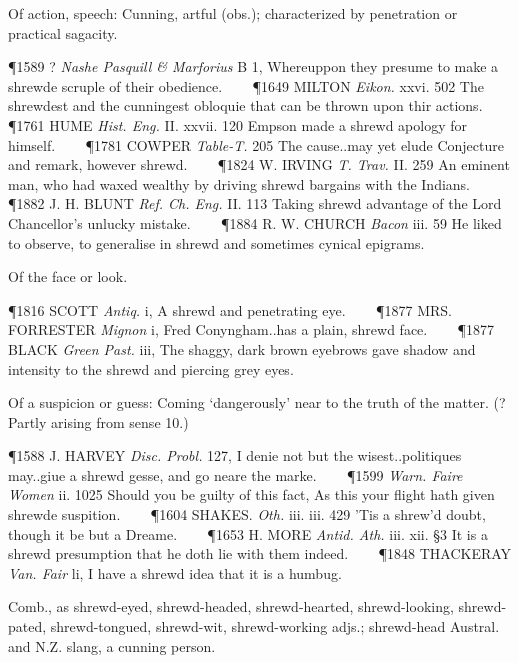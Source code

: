 \begin{description}[wide, labelwidth=!, labelindent=0pt]
\begin{myenumerate}
 Of action, speech: Cunning, artful (obs.); characterized by penetration or practical sagacity.

\P 1589 ?  \textit{Nashe Pasquill \& Marforius} B 1, Whereuppon they presume to make a shrewde scruple of their obedience.    
\P 1649 MILTON  \textit{Eikon.} xxvi. 502 The shrewdest and the cunningest obloquie that can be thrown upon thir actions.    
\P 1761 HUME  \textit{Hist. Eng.} II. xxvii. 120 Empson made a shrewd apology for himself.    
\P 1781 COWPER  \textit{Table-T.} 205 The cause..may yet elude Conjecture and remark, however shrewd.    
\P 1824 W. IRVING  \textit{T. Trav.} II. 259 An eminent man, who had waxed wealthy by driving shrewd bargains with the Indians.    
\P 1882 J. H. BLUNT  \textit{Ref. Ch. Eng.} II. 113 Taking shrewd advantage of the Lord Chancellor's unlucky mistake.    
\P 1884 R. W. CHURCH  \textit{Bacon} iii. 59 He liked to observe, to generalise in shrewd and sometimes cynical epigrams.

 Of the face or look.

\P 1816 SCOTT  \textit{Antiq.} i, A shrewd and penetrating eye.    
\P 1877 MRS. FORRESTER  \textit{Mignon} i, Fred Conyngham..has a plain, shrewd face.    
\P 1877 BLACK  \textit{Green Past.} iii, The shaggy, dark brown eyebrows gave shadow and intensity to the shrewd and piercing grey eyes.

 Of a suspicion or guess: Coming ‘dangerously’ near to the truth of the matter. (?Partly arising from sense 10.)

\P 1588 J. HARVEY  \textit{Disc. Probl.} 127, I denie not but the wisest..politiques may..giue a shrewd gesse, and go neare the marke.    
\P 1599 \textit{Warn.  Faire Women} ii. 1025 Should  you be guilty of this fact, As this your flight hath given shrewde suspition.    
\P 1604 SHAKES.  \textit{Oth.} iii. iii. 429 'Tis a shrew'd doubt, though it be but a Dreame.    
\P 1653 H. MORE  \textit{Antid. Ath.} iii. xii. §3 It is a shrewd presumption that he doth lie with them indeed.    
\P 1848 THACKERAY  \textit{Van. Fair} li, I have a shrewd idea that it is a humbug.

 Comb., as shrewd-eyed, shrewd-headed, shrewd-hearted, shrewd-looking, shrewd-pated, shrewd-tongued, shrewd-wit, shrewd-working adjs.; shrewd-head Austral. and N.Z. slang, a cunning person.


\end{myenumerate}
\end{description}
